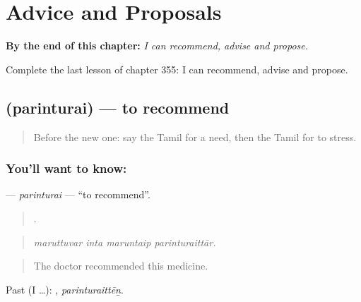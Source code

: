 
\chapter{Advice and Proposals}
\label{ch:ta-advice-and-proposals}

\begin{chapteropening}
\textbf{By the end of this chapter:} \emph{I can recommend, advise and propose.}

Complete the last lesson of chapter 355: I can recommend, advise and propose.
\end{chapteropening}

\section[\texorpdfstring{\ta{பரிந்துரை} (parinturai)}{பரிந்துரை (parinturai)}]{ (parinturai) — to recommend}

\label{lesson:TA-C355-parinturai}



\begin{quote}
Before the new one: say the Tamil for a need, then the Tamil for to stress.
\end{quote}

\subsection*{You'll want to know: }
\textbf{} — \emph{parinturai} — \textquotedblleft{}to recommend\textquotedblright{}.

\begin{quote}
   .
\end{quote}

\begin{quote}
\emph{maruttuvar inta maruntaip parinturaittār.}
\end{quote}

\begin{quote}
The doctor recommended this medicine.
\end{quote}

Past (I …): , \emph{parinturaittēṉ}.

